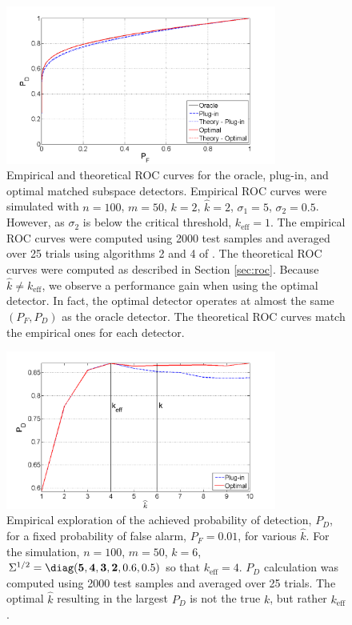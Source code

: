 \begin{figure}
\centering
\includegraphics[width=3.5in]{figures/roc_curves.png}
\caption{Empirical and theoretical ROC curves for the oracle, plug-in, and optimal matched subspace detectors. Empirical ROC curves were simulated with $n=100$, $m=50$, $k=2$, $\widehat{k}=2$, $\sigma_1=5$, $\sigma_2=0.5$. However, as $\sigma_2$ is below the critical threshold, $k_{\text{eff}} = 1$. The empirical ROC curves were computed using 2000 test samples and averaged over 25 trials using algorithms 2 and 4 of \cite{fawcett2006introduction}. The theoretical ROC curves were computed as described in Section \ref{sec:roc}. Because $\widehat{k}\neq k_{\text{eff}}$, we observe a performance gain when using the optimal detector. In fact, the optimal detector operates at almost the same $(P_F, P_D)$ as the oracle detector. The theoretical ROC curves match the empirical ones for each detector.}
\label{fig:roc}
\end{figure}

\begin{figure}
\centering
\includegraphics[width=3.5in]{figures/k_hat_graph.png}
\caption{Empirical exploration of the achieved probability of detection, $P_D$, for a fixed probability of false alarm, $P_F=0.01$, for various $\widehat{k}$. For the simulation, $n=100$, $m=50$, $k=6$, $\Sigma^{1/2} = \diag({\bf{5,4,3,2}},0.6,0.5)$ so that $k_{\text{eff}}=4$. $P_D$ calculation was computed using 2000 test samples and averaged over 25 trials. The optimal $\widehat{k}$ resulting in the largest $P_D$ is not the true $k$, but rather $k_\text{eff}$.}
\label{fig:khat}
\end{figure}

